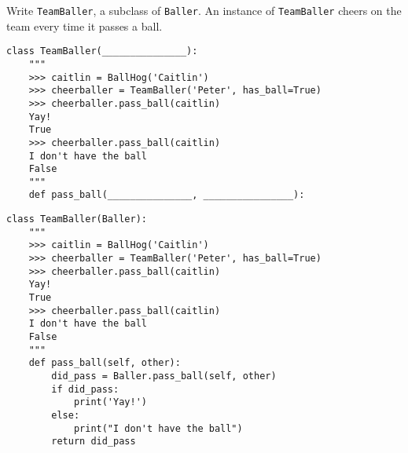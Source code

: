 \begin{blocksection}
\question Write \lstinline$TeamBaller$, a subclass of \lstinline$Baller$. An instance of \lstinline$TeamBaller$ cheers on the team every time it passes a ball.

\ifprintanswers\else
\begin{lstlisting}
class TeamBaller(_______________):
    """
    >>> caitlin = BallHog('Caitlin')
    >>> cheerballer = TeamBaller('Peter', has_ball=True)
    >>> cheerballer.pass_ball(caitlin)
    Yay!
    True
    >>> cheerballer.pass_ball(caitlin)
    I don't have the ball
    False
    """
    def pass_ball(_______________, ________________):
\end{lstlisting}
\fi

\begin{solution}[1in]
\begin{lstlisting}
class TeamBaller(Baller):
    """
    >>> caitlin = BallHog('Caitlin')
    >>> cheerballer = TeamBaller('Peter', has_ball=True)
    >>> cheerballer.pass_ball(caitlin)
    Yay!
    True
    >>> cheerballer.pass_ball(caitlin)
    I don't have the ball
    False
    """
    def pass_ball(self, other):
        did_pass = Baller.pass_ball(self, other)
        if did_pass:
            print('Yay!')
        else:
            print("I don't have the ball")
        return did_pass
\end{lstlisting}
\end{solution}
\end{blocksection}
